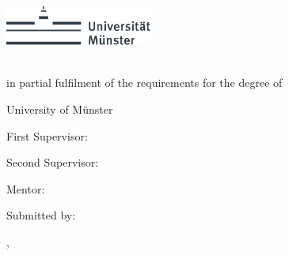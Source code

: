 \thispagestyle{empty}

\begin{center}
    \includegraphics[height=1.3cm]{logos/unims.pdf}
    \hfill
    \par
    \vspace*{8ex}
    {
        \linespread{0.9}
        \LARGE
        \printtitle
        \par
    }
    \normalsize
    \vspace*{8ex}
    \large
    \textsc{\printtype}\\
    \normalsize
    in partial fulfilment of the requirements for the degree of\\
    \large
    \textsc{\printdegree}
    \par
    \normalsize
    \vspace*{6ex}
    University of Münster\\
    \printinstitute
\end{center}



\par
\normalsize
\vspace*{6ex}
First Supervisor:\\
\large
\textit{\printfirstassessor}

\par
\normalsize
\vspace*{2ex}
Second Supervisor:\\
\large
\textit{\printsecondassessor}

\par
\normalsize
\vspace*{2ex}
Mentor:\\
\large
\textit{\printsupervisor}

\par
\normalsize
\vspace*{6ex}
Submitted by:\\
\large
\textit{\printname}

\par
\normalsize
\vspace*{4ex}
\printcity, \makeatletter
\monthname
\makeatother~\the\year
